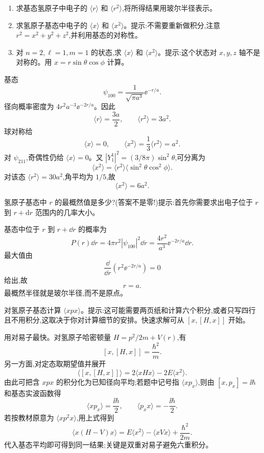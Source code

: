 \begin{question}
\begin{enumerate}
\item 求基态氢原子中电子的 $\langle r\rangle$ 和 $\langle r^2\rangle$,将所得结果用玻尔半径表示。
\item 求氢原子基态中电子的 $\langle x\rangle$ 和 $\langle x^2\rangle$。提示:不需要重新做积分,注意 $r^2=x^2+y^2+z^2$,并利用基态的对称性。
\item 对 $n=2,\ell=1,m=1$ 的状态,求 $\langle x\rangle$ 和 $\langle x^2\rangle$。提示:这个状态对 $x,y,z$ 轴不是对称的。用 $x=r\sin\theta\cos\phi$ 计算。
\end{enumerate}
\end{question}
\begin{solution}

基态
\[
\psi_{100}=\frac{1}{\sqrt{\pi a^3}}\ee^{-r/a}.
\]
径向概率密度为 $4r^2a^{-3}\ee^{-2r/a}$。因此
\[
\langle r\rangle=\frac{3a}{2},\qquad \langle r^2\rangle=3a^2.
\]
球对称给
\[
\langle x\rangle=0,
\qquad \langle x^2\rangle=\frac13\langle r^2\rangle=a^2.
\]
对 $\psi_{211}$,奇偶性仍给 $\langle x\rangle=0$。又 $|Y_1^1|^2=(3/8\pi)\sin^2\theta$,可分离为
\[
\langle x^2\rangle=\langle r^2\rangle\langle \sin^2\theta\cos^2\phi\rangle.
\]
对该态 $\langle r^2\rangle=30a^2$,角平均为 $1/5$,故
\[
\langle x^2\rangle=6a^2.
\]

\end{solution}

\begin{question}
氢原子基态中 $r$ 的最概然值是多少?(答案不是零!)提示:首先你需要求出电子位于 $r$ 到 $r+\mathrm dr$ 范围内的几率大小。
\end{question}
\begin{solution}

基态中位于 $r$ 到 $r+\dd r$ 的概率为
\[
P(r)\dd r=4\pi r^2|\psi_{100}|^2\dd r=\frac{4r^2}{a^3}\ee^{-2r/a}\dd r.
\]
最大值由
\[
\frac{\dd}{\dd r}\left(r^2\ee^{-2r/a}\right)=0
\]
给出,故
\[
r=a.
\]
最概然半径就是玻尔半径,而不是原点。

\end{solution}

\begin{question}
对氢原子基态计算 $\langle xpx\rangle$。提示:这可能需要两页纸和计算六个积分,或者只写四行且不用积分,这取决于你对计算细节的安排。快速求解可从 $[x,[H,x]]$ 开始。
\end{question}
\begin{solution}

用对易子最快。对氢原子哈密顿量 $H=p^2/2m+V(r)$,有
\[
[x,[H,x]]=\frac{\hbar^2}{m}.
\]
另一方面,对定态取期望值并展开
\[
\langle[x,[H,x]]\rangle=2\langle xHx\rangle-2E\langle x^2\rangle.
\]
由此可把含 $xpx$ 的积分化为已知径向平均;若题中记号指 $\langle xp_x\rangle$,则由 $[x,p_x]=\ii\hbar$ 和基态实波函数得
\[
\langle xp_x\rangle=\frac{\ii\hbar}{2},
\qquad
\langle p_xx\rangle=-\frac{\ii\hbar}{2}.
\]
若按教材原意为 $\langle x p^2 x\rangle$,用上式得到
\[
\langle x(H-V)x\rangle=E\langle x^2\rangle-\langle xVx\rangle+\frac{\hbar^2}{2m}.
\]
代入基态平均即可得到同一结果;关键是双重对易子避免六重积分。

\end{solution}


